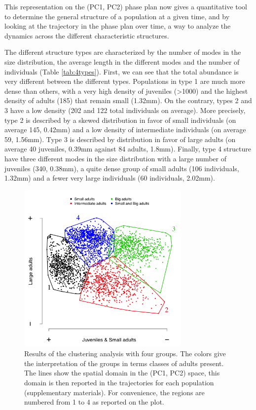 This representation on the (PC1, PC2) phase plan now gives a quantitative tool
to determine the general structure of a population at a given time, and by
looking at the trajectory in the phase plan over time, a way to analyze the
dynamics across the different characteristic structures.

The different structure types are characterized by the number of modes in the
size distribution, the average length in the different modes and the number of
individuals (Table \ref{tab:4types}). First, we can see that the total abundance
is very different between the different types. Populations in type 1 are much
more dense than others, with a very high density of juveniles (>1000) and the
highest density of adults (185) that remain small (1.32mm). On the contrary,
types 2 and 3 have a low density (202 and 122 total individuals on average).
More precisely, type 2 is described by a skewed distribution in favor of small individuals
(on average 145, 0.42mm) and a low density of intermediate individuals (on
average 59, 1.56mm). Type 3 is described by distribution in favor of large
adults (on average 40 juveniles, 0.39mm against 84 adults, 1.8mm). Finally, type
4 structure have three different modes in the size distribution with a large
number of juveniles (340, 0.38mm), a quite dense group of small adults
(106 individuals, 1.32mm) and a fewer very large individuals (60 individuals,
2.02mm).

\begin{figure}[!ht]
\begin{center}
\includegraphics[width=0.75\textwidth]{3-1_ChapExp1/Fig/AnnSP5}
\caption[Results of the clustering analysis
with four groups]{Results of the clustering analysis with four groups. The
colors give the interpretation of the groups in terms classes of adults present. The lines show the spatial domain in the (PC1, PC2) space, this domain is then reported in
the trajectories for each population (supplementary materials). For convenience,
the regions are numbered from 1 to 4 as reported on the plot.}
\label{fig:AnSP5}
\end{center}
\end{figure}

